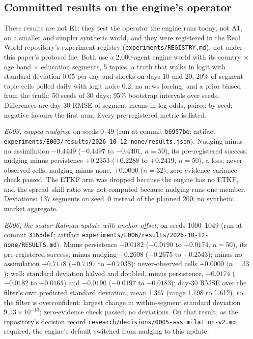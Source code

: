 \documentclass[10pt]{article}
\theoremstyle{remark}
\begin{document}
\subsection{Committed results on the engine's operator}
\label{sec:prior}
These results are not E1: they test the operator the engine runs today, not A1, on a smaller and simpler synthetic world, and they were registered in the Real World repository's experiment registry (\nolinkurl{experiments/REGISTRY.md}), not under this paper's protocol file. Both use a 2,000-agent engine world with its country $\times$ age band $\times$ education segments, 5 topics, a truth that walks in logit with standard deviation 0.05 per day and shocks on days 10 and 20, 20\% of segment--topic cells polled daily with logit noise 0.2, no news forcing, and a prior biased from the truth; 50 seeds of 30 days; 95\% bootstrap intervals over seeds. Differences are day-30 RMSE of segment means in log-odds, paired by seed; negative favours the first arm. Every pre-registered metric is listed.

\emph{E003, capped nudging}, on seeds 0--49 (run at commit \texttt{b6957be}; artifact \nolinkurl{experiments/E003/results/2026-10-12-none/results.json}). Nudging minus no assimilation $-0.4449$ ($-0.4497$ to $-0.4401$, $n=50$), its pre-registered success; nudging minus persistence $+0.2353$ ($+0.2288$ to $+0.2419$, $n=50$), a loss; never-observed cells, nudging minus none, $+0.0000$ ($n=32$); zero-evidence variance check passed. The ETKF arm was dropped because the engine has no ETKF, and the spread--skill ratio was not computed because nudging runs one member. Deviations: 137 segments on seed~0 instead of the planned 200; no synthetic market aggregate.

\emph{E006, the scalar Kalman update with anchor offset}, on seeds 1000--1049 (run at commit \texttt{3163def}; artifact \nolinkurl{experiments/E006/results/2026-10-12-none/RESULTS.md}). Minus persistence $-0.0182$ ($-0.0190$ to $-0.0174$, $n=50$), its pre-registered success; minus nudging $-0.2608$ ($-0.2675$ to $-0.2543$); minus no assimilation $-0.7118$ ($-0.7197$ to $-0.7038$); never-observed cells $+0.0000$ ($n=33$); walk standard deviation halved and doubled, minus persistence, $-0.0174$ ($-0.0182$ to $-0.0165$) and $-0.0190$ ($-0.0197$ to $-0.0183$); day-30 RMSE over the filter's own predicted standard deviation, mean 1.367 (range 1.198 to 1.612), so the filter is overconfident; largest change in within-segment standard deviation $9.13\times10^{-13}$; zero-evidence check passed; no deviations. On that result, as the repository's decision record \nolinkurl{research/decisions/0005-assimilation-v2.md} required, the engine's default switched from nudging to this update.
\end{document}
